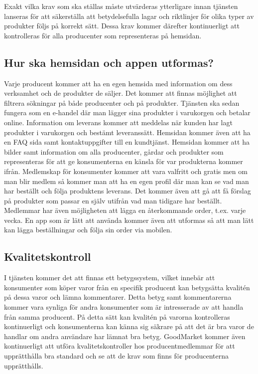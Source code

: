 \documentclass[10pt,a4paper,oneside]{article}
\begin{document}
Exakt vilka krav som ska ställas måste utvärderas ytterligare innan tjänsten lanseras för att säkerställa att betydelsefulla lagar och riktlinjer för olika typer av produkter följs på korrekt sätt. Dessa krav kommer därefter kontinuerligt att kontrolleras för alla producenter som representeras på hemsidan. 

\subsection{Hur ska hemsidan och appen utformas?}
Varje producent kommer att ha en egen hemsida med information om dess verksamhet och de produkter de säljer. Det kommer att finnas möjlighet att filtrera sökningar på både producenter och på produkter. Tjänsten ska sedan fungera som en e-handel där man lägger sina produkter i varukorgen och betalar online. Information om leverans kommer att meddelas när kunden har lagt produkter i varukorgen och bestämt leveranssätt. Hemsidan kommer även att ha en FAQ sida samt kontaktuppgifter till en kundtjänst. Hemsidan kommer att ha bilder samt information om alla producenter, gårdar och produkter som representeras för att ge konsumenterna en känsla för var produkterna kommer ifrån. Medlemskap för konsumenter kommer att vara valfritt och gratis men om man blir medlem så kommer man att ha en egen profil där man kan se vad man har beställt och följa produktens leverans. Det kommer även att gå att få förslag på produkter som passar en själv utifrån vad man tidigare har beställt. Medlemmar har även möjligheten att lägga en återkommande order, t.ex. varje vecka. En app som är lätt att använda kommer även att utformas så att man lätt kan lägga beställningar och följa sin order via mobilen.  


\subsection{Kvalitetskontroll}
I tjänsten kommer det att finnas ett betygssystem, vilket innebär att konsumenter som köper varor från en specifik producent kan betygsätta kvalitén på dessa varor och lämna kommentarer. Detta betyg samt kommentarerna kommer vara synliga för andra konsumenter som är intresserade av att handla från samma producent. På detta sätt kan kvalitén på varorna kontrolleras kontinuerligt och konsumenterna kan känna sig säkrare på att det är bra varor de handlar om andra användare har lämnat bra betyg. GoodMarket kommer även kontinuerligt att utföra kvalitetskontroller hos producentmedlemmar för att upprätthålla bra standard och se att de krav som finns för producenterna upprätthålls. 
\end{document}
